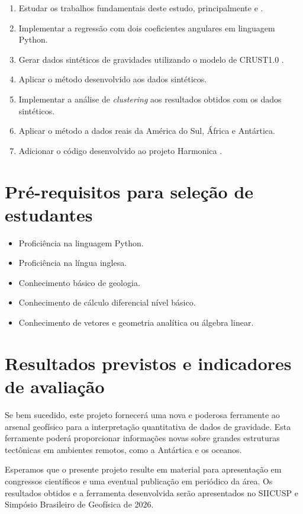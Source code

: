 \documentclass[onecolumn,a4paper,11pt]{article}
\begin{document}
\begin{enumerate}
    \item Estudar os trabalhos fundamentais deste estudo, principalmente \citet{Braitenberg2015} e \citet{Pivetta2020}.
    \item Implementar a regressão com dois coeficientes angulares em linguagem Python.
    \item Gerar dados sintéticos de gravidades utilizando o modelo de CRUST1.0 \citep{Laske2013}.
    \item Aplicar o método desenvolvido aos dados sintéticos.
    \item Implementar a análise de \textit{clustering} aos resultados obtidos com os dados sintéticos.
    \item Aplicar o método a dados reais da América do Sul, África e Antártica.
    \item Adicionar o código desenvolvido ao projeto Harmonica \citep{Harmonica}.
\end{enumerate}

\section{Pré-requisitos para seleção de estudantes}

\begin{itemize}
    \item Proficiência na linguagem Python.
    \item Proficiência na língua inglesa.
    \item Conhecimento básico de geologia.
    \item Conhecimento de cálculo diferencial nível básico.
    \item Conhecimento de vetores e geometria analítica ou álgebra linear.
\end{itemize}

\section{Resultados previstos e indicadores de avaliação}

Se bem sucedido, este projeto fornecerá uma nova e poderosa ferramente ao arsenal geofísico para a interpretação quantitativa de dados de gravidade. Esta ferramente poderá proporcionar informações novas sobre grandes estruturas tectônicas em ambientes remotos, como a Antártica e os oceanos.

Esperamos que o presente projeto resulte em material para apresentação em congressos científicos e uma eventual publicação em periódico da área.
Os resultados obtidos e a ferramenta desenvolvida serão apresentados no SIICUSP  e Simpósio Brasileiro de Geofísica de 2026.
\end{document}
